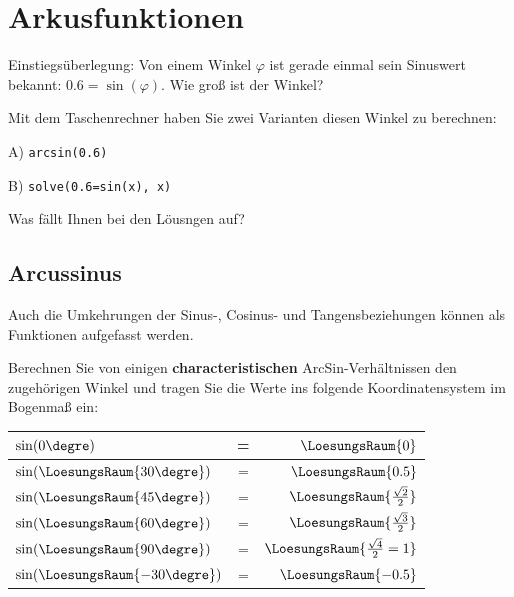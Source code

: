 
\section{Arkusfunktionen}

Einstiegsüberlegung: Von einem Winkel $\varphi$ ist gerade einmal sein Sinuswert bekannt: $0.6 = \sin(\varphi)$. Wie groß ist der Winkel?

\trigsysDsin{}



Mit dem Taschenrechner haben Sie zwei Varianten diesen Winkel zu berechnen:

A) \texttt{arcsin(0.6)}

B) \texttt{solve(0.6=sin(x), x)}

Was fällt Ihnen bei den Löusngen auf?
\newpage



\subsection{Arcussinus}
Auch die Umkehrungen der Sinus-, Cosinus- und Tangensbeziehungen können
als Funktionen aufgefasst werden.

Berechnen Sie von einigen \textbf{characteristischen}
ArcSin-Verhältnissen den zugehörigen Winkel und tragen Sie die Werte ins folgende
Koordinatensystem im Bogenmaß ein:

\begin{tabular}{l|c|r}
$\sin(0\degre)$ &=& $\LoesungsRaum{0}$\\\hline
$\sin(\LoesungsRaum{30\degre})$ &=& $\LoesungsRaum{0.5}$\\\hline
$\sin(\LoesungsRaum{45\degre})$ &=& $\LoesungsRaum{\frac{\sqrt{2}}{2}}$\\\hline
$\sin(\LoesungsRaum{60\degre})$ &=& $\LoesungsRaum{\frac{\sqrt{3}}{2}}$\\\hline
$\sin(\LoesungsRaum{90\degre})$ &=& $\LoesungsRaum{\frac{\sqrt{4}}{2} = 1}$\\\hline
$\sin(\LoesungsRaum{-30\degre})$ &=& $\LoesungsRaum{-0.5}$
\end{tabular}


